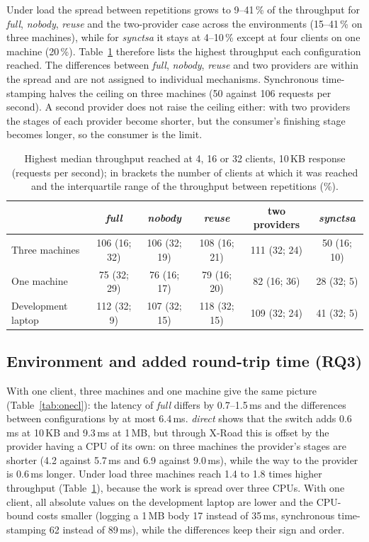 \documentclass[conference,a4paper]{IEEEtran}
\begin{document}
Under load the spread between repetitions grows to 9--41\,\% of the throughput for \emph{full},
\emph{nobody}, \emph{reuse} and the two-provider case across the environments (15--41\,\% on three
machines), while for \emph{synctsa} it stays at 4--10\,\% except at four clients on one machine
(20\,\%).
Table~\ref{tab:load} therefore lists the highest throughput each configuration reached. The
differences between \emph{full}, \emph{nobody}, \emph{reuse} and two providers are within the spread
and are not assigned to individual mechanisms. Synchronous time-stamping halves the ceiling on three
machines (50 against 106 requests per second). A second provider does not raise the ceiling either:
with two providers the stages of each provider become shorter, but the consumer's finishing stage
becomes longer, so the consumer is the limit.

\begin{table}[t]
\centering\small
\caption{Highest median throughput reached at 4, 16 or 32 clients, 10\,KB response (requests per
second); in brackets the number of clients at which it was reached and the interquartile range of
the throughput between repetitions (\%).}
\label{tab:load}
\begin{tabular}{@{}lccccc@{}}
\toprule
& \emph{full} & \emph{nobody} & \emph{reuse} & two providers & \emph{synctsa} \\
\midrule
Three machines & 106 (16; 32) & 106 (32; 19) & 108 (16; 21) & 111 (32; 24) & 50 (16; 10) \\
One machine & 75 (32; 29) & 76 (16; 17) & 79 (16; 20) & 82 (16; 36) & 28 (32; 5) \\
Development laptop & 112 (32; 9) & 107 (32; 15) & 118 (32; 15) & 109 (32; 24) & 41 (32; 5) \\
\bottomrule
\end{tabular}
\end{table}

\subsection{Environment and added round-trip time (RQ3)}\label{sec:rq3}

With one client, three machines and one machine give the same picture (Table~\ref{tab:onecl}): the
latency of \emph{full} differs by 0.7--1.5\,ms and the differences between configurations by at most
6.4\,ms.
\emph{direct} shows that the switch adds 0.6\,ms at 10\,KB and 9.3\,ms at 1\,MB, but through X-Road
this is offset by the provider having a CPU of its own: on three machines the provider's stages are
shorter (4.2 against 5.7\,ms and 6.9 against 9.0\,ms), while the way to the provider is 0.6\,ms longer.
Under load three machines reach 1.4 to 1.8 times higher throughput (Table~\ref{tab:load}), because the
work is spread over three CPUs. With one client, all absolute values on the development laptop are lower and the
CPU-bound costs smaller (logging a 1\,MB body 17 instead of 35\,ms, synchronous time-stamping 62
instead of 89\,ms), while the differences keep their sign and order.
\end{document}
